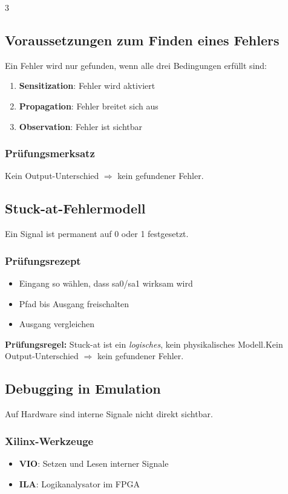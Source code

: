 \documentclass[10pt,a4paper]{article}
\newcommand{\hilite}[1]{\colorbox{yellow!25}{#1}}
\newcommand{\imp}[1]{\textbf{\textcolor{codeemph}{#1}}}
\begin{document}
\begin{multicols}{3}
\subsection{Voraussetzungen zum Finden eines Fehlers}
Ein Fehler wird nur gefunden, wenn alle drei Bedingungen erfüllt sind:

\begin{enumerate}
  \item \textbf{Sensitization}: Fehler wird aktiviert
  \item \textbf{Propagation}: Fehler breitet sich aus
  \item \textbf{Observation}: Fehler ist sichtbar
\end{enumerate}

\subsubsection*{\textcolor{codeemph}{Prüfungsmerksatz}}
Kein Output-Unterschied $\Rightarrow$ kein gefundener Fehler.

\subsection{Stuck-at-Fehlermodell}
Ein Signal ist permanent auf 0 oder 1 festgesetzt.

\subsubsection*{\textcolor{codeemph}{Prüfungsrezept}}
\begin{itemize}
  \item Eingang so wählen, dass sa0/sa1 wirksam wird
  \item Pfad bis Ausgang freischalten
  \item Ausgang vergleichen
\end{itemize}

\imp{Prüfungsregel:}  
\hilite{Stuck-at} ist ein \emph{logisches}, kein \hilite{physikalisches} \hilite{Modell}.Kein Output-Unterschied $\Rightarrow$ kein gefundener Fehler.

\subsection{Debugging in Emulation}
Auf Hardware sind interne Signale nicht direkt sichtbar.

\subsubsection*{Xilinx-Werkzeuge}
\begin{itemize}
  \item \textbf{VIO}: Setzen und Lesen interner Signale
  \item \textbf{ILA}: Logikanalysator im FPGA
\end{itemize}


\end{multicols}
\end{document}
